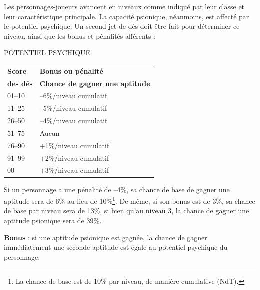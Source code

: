 \documentclass[12pt]{article}
\begin{document}
{\bigskip

Les personnages-joueurs avancent en niveaux comme indiqué par leur classe et leur caractéristique principale. La capacité psionique, néanmoins, est affecté par le potentiel psychique. Un second jet de dés doit être fait pour déterminer ce niveau, ainsi que les bonus et pénalités afférents :

\bigskip

{\parindent3cm POTENTIEL PSYCHIQUE

\bigskip

\begin{tabular}{p{3cm}l}
\textbf{Score} & \textbf{Bonus ou pénalité} \\
\textbf{des dés} & \textbf{Chance de gagner une aptitude} \\
01--10 & --6\%/niveau cumulatif \\
11--25 & --5\%/niveau cumulatif \\
26--50 & --4\%/niveau cumulatif \\
51--75 & Aucun \\
76--90 & +1\%/niveau cumulatif \\
91--99 & +2\%/niveau cumulatif \\
\hspace{0.4cm}00 & +3\%/niveau cumulatif \\
\end{tabular}}

\bigskip

Si un personnage a une pénalité de --4\%, sa chance de base de gagner une aptitude sera de 6\% au lieu de 10\%\footnote{La chance de base est de 10\% par niveau, de manière cumulative (NdT).}. De même, si son bonus est de 3\%, sa chance de base par niveau sera de 13\%, si bien qu'au niveau 3, la chance de gagner une aptitude psionique sera de 39\%.

\bigskip

\textbf{Bonus} : si une aptitude psionique est gagnée, la chance de gagner immédiatement une seconde aptitude est égale au potentiel psychique du personnage.

}
\end{document}
